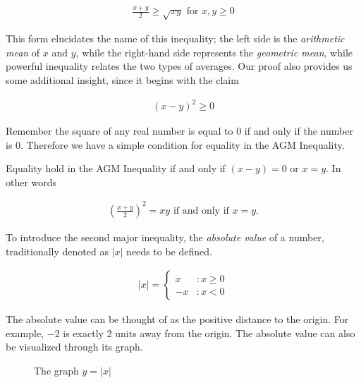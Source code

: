 \documentclass[twoside]{report}
\begin{document}
\begin{align}
	\frac{x + y}{2} \ge \sqrt{xy} \text{ for } x, y \ge 0
\end{align}

This form elucidates the name of this inequality; the left side is the \emph{arithmetic mean} of $x$ and $y$, while the right-hand side represents the \emph{geometric mean}, while powerful inequality relates the two types of averages. Our proof also provides us some additional insight, since it begins with the claim

\begin{align*}
	(x - y)^2 \ge 0
\end{align*}

Remember the square of any real number is equal to 0 if and only if the number is 0. Therefore we have a simple condition for equality in the AGM Inequality.

\vspace{\baselineskip}
\begin{theorem}
	Equality hold in the AGM Inequality if and only if $(x - y) = 0$ or $x = y$. In other words
	
	\begin{align}
		\left( \frac{x + y}{2} \right)^2 = xy \text{ if and only if } x = y.
	\end{align}
\end{theorem}

To introduce the second major inequality, the \emph{absolute value} of a number, traditionally denoted as $|x|$ needs to be defined.

\begin{align*}
	|x| = \begin{cases}
		x &: x \ge 0 \\
		-x &: x < 0
	\end{cases}
\end{align*}

The absolute value can be thought of as the positive distance to the origin. For example, $-2$ is exactly 2 units away from the origin. The absolute value can also be visualized through its graph.

\begin{figure}
	\begin{center}
	\end{center}
	\caption{The graph $y = |x|$}
\end{figure}
\end{document}
